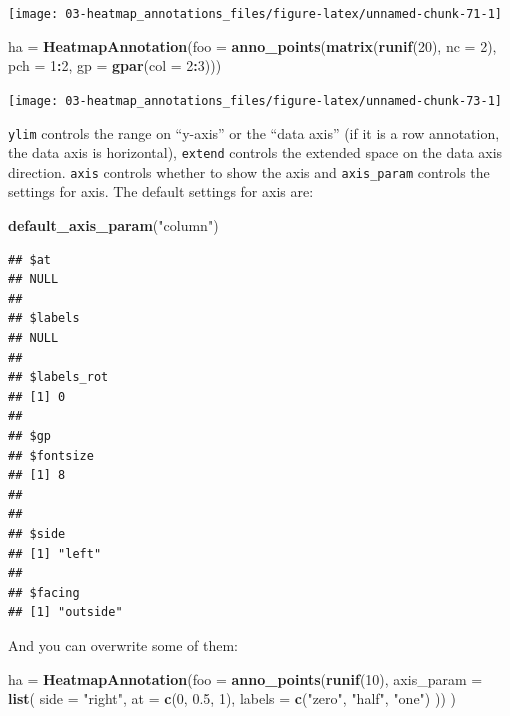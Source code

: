 \documentclass[]{book}
\newenvironment{Shaded}{\begin{snugshade}}{\end{snugshade}}
\newcommand{\KeywordTok}[1]{\textcolor[rgb]{0.13,0.29,0.53}{\textbf{#1}}}
\newcommand{\DataTypeTok}[1]{\textcolor[rgb]{0.13,0.29,0.53}{#1}}
\newcommand{\DecValTok}[1]{\textcolor[rgb]{0.00,0.00,0.81}{#1}}
\newcommand{\FloatTok}[1]{\textcolor[rgb]{0.00,0.00,0.81}{#1}}
\newcommand{\StringTok}[1]{\textcolor[rgb]{0.31,0.60,0.02}{#1}}
\newcommand{\OperatorTok}[1]{\textcolor[rgb]{0.81,0.36,0.00}{\textbf{#1}}}
\newcommand{\NormalTok}[1]{#1}
\theoremstyle{definition}
\theoremstyle{definition}
\theoremstyle{definition}
\theoremstyle{remark}
\begin{document}
\begin{center}\texttt{[image: 03-heatmap\_annotations\_files/figure-latex/unnamed-chunk-71-1]} \end{center}

\begin{Shaded}
\begin{Highlighting}[]
\NormalTok{ha =}\StringTok{ }\KeywordTok{HeatmapAnnotation}\NormalTok{(}\DataTypeTok{foo =} \KeywordTok{anno_points}\NormalTok{(}\KeywordTok{matrix}\NormalTok{(}\KeywordTok{runif}\NormalTok{(}\DecValTok{20}\NormalTok{), }\DataTypeTok{nc =} \DecValTok{2}\NormalTok{), }
    \DataTypeTok{pch =} \DecValTok{1}\OperatorTok{:}\DecValTok{2}\NormalTok{, }\DataTypeTok{gp =} \KeywordTok{gpar}\NormalTok{(}\DataTypeTok{col =} \DecValTok{2}\OperatorTok{:}\DecValTok{3}\NormalTok{)))}
\end{Highlighting}
\end{Shaded}

\begin{center}\texttt{[image: 03-heatmap\_annotations\_files/figure-latex/unnamed-chunk-73-1]} \end{center}

\texttt{ylim} controls the range on ``y-axis'' or the ``data axis'' (if
it is a row annotation, the data axis is horizontal), \texttt{extend}
controls the extended space on the data axis direction. \texttt{axis}
controls whether to show the axis and \texttt{axis\_param} controls the
settings for axis. The default settings for axis are:

\begin{Shaded}
\begin{Highlighting}[]
\KeywordTok{default_axis_param}\NormalTok{(}\StringTok{"column"}\NormalTok{)}
\end{Highlighting}
\end{Shaded}

\begin{verbatim}
## $at
## NULL
## 
## $labels
## NULL
## 
## $labels_rot
## [1] 0
## 
## $gp
## $fontsize
## [1] 8
## 
## 
## $side
## [1] "left"
## 
## $facing
## [1] "outside"
\end{verbatim}

And you can overwrite some of them:

\begin{Shaded}
\begin{Highlighting}[]
\NormalTok{ha =}\StringTok{ }\KeywordTok{HeatmapAnnotation}\NormalTok{(}\DataTypeTok{foo =} \KeywordTok{anno_points}\NormalTok{(}\KeywordTok{runif}\NormalTok{(}\DecValTok{10}\NormalTok{), }
    \DataTypeTok{axis_param =} \KeywordTok{list}\NormalTok{(}
        \DataTypeTok{side =} \StringTok{"right"}\NormalTok{,}
        \DataTypeTok{at =} \KeywordTok{c}\NormalTok{(}\DecValTok{0}\NormalTok{, }\FloatTok{0.5}\NormalTok{, }\DecValTok{1}\NormalTok{), }
        \DataTypeTok{labels =} \KeywordTok{c}\NormalTok{(}\StringTok{"zero"}\NormalTok{, }\StringTok{"half"}\NormalTok{, }\StringTok{"one"}\NormalTok{)}
\NormalTok{    ))}
\NormalTok{)}
\end{Highlighting}
\end{Shaded}
\end{document}
